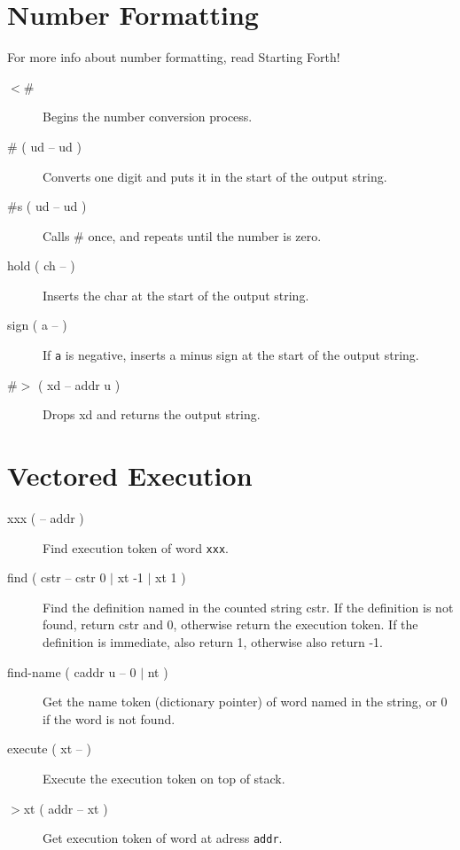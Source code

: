 \section{Number Formatting}

For more info about number formatting, read Starting Forth!

\begin{description}

\item[$<$\#]\index{$<$\#} Begins the number conversion process.
\item[\# ( ud -- ud )]\index{\#} Converts one digit and puts it in the start of the output string.
\item[\#s ( ud -- ud )] Calls \# once, and repeats until the number is zero.
\item[hold ( ch -- )] Inserts the char at the start of the output string.
\item[sign ( a -- )] If \texttt{a} is negative, inserts a minus sign at the start of the output string.
\item[\#$>$ ( xd -- addr u )]\index{\#$>$} Drops xd and returns the output string.

\end{description}

\section{Vectored Execution}

\begin{description}
\item[\textquotesingle{} xxx ( -- addr )] Find execution token of word \texttt{xxx}.
\item[find ( cstr -- cstr 0 $\vert$ xt -1 $\vert$ xt 1 )] Find the definition named in the counted string cstr. If the definition is not found, return cstr and 0, otherwise return the execution token. If the definition is immediate, also return 1, otherwise also return -1.
\item[find-name ( caddr u -- 0 $\vert$ nt )] Get the name token (dictionary pointer) of word named in the string, or 0 if the word is not found.
\item[execute ( xt -- )] Execute the execution token on top of stack.
\item[$>$xt ( addr -- xt )] Get execution token of word at adress \texttt{addr}.

\end{description}

